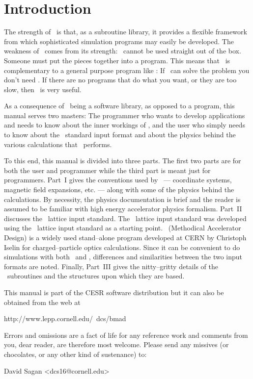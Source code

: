 \section*{Introduction}

The strength of \bmad\ is that, as a subroutine library, it provides a
flexible framework from which sophisticated simulation programs may
easily be developed.  The weakness of \bmad\ comes from its strength:
\bmad\ cannot be used straight out of the box. Someone must put the
pieces together into a program. This means that \bmad\ is complementary
to a general purpose program like \mad: If \mad\ can solve the problem
you don't need \bmad. If there are no programs that do what you want,
or they are too slow, then \bmad\ is very useful.

As a consequence of \bmad\ being a software library, as opposed to a
program, this manual serves two masters: The programmer who wants to
develop applications and needs to know about the inner workings of \bmad,
and the user who simply needs to know about the \bmad\ standard input
format and about the physics behind the various calculations that \bmad\
performs.

To this end, this manual is divided into three parts. The first two
parts are for both the user and programmer while the third part is
meant just for programmers. Part~I gives the conventions used by
\bmad\ --- coordinate systems, magnetic field expansions, etc. ---
along with some of the physics behind the calculations. By necessity,
the physics documentation is brief and the reader is assumed to be familiar
with high energy accelerator physics formalism. Part~II discusses the
\bmad\ lattice input standard.  The \bmad\ lattice input standard was
developed using the \mad\ lattice input standard as a starting
point. \mad\ (Methodical Accelerator Design) is a widely used
stand--alone program developed at CERN by Christoph Iselin for
charged--particle optics calculations. Since it can be convenient
to do simulations with both \mad\ and \bmad, differences and
similarities between the two input formats are noted. 
Finally, Part~III gives the nitty--gritty details of the \bmad\
subroutines and the structures upon which they are based.

This manual is part of the 
CESR software distribution but it can also be obtained from the web at
\begin{example}
  http://www.lepp.cornell.edu/~dcs/bmad
\end{example}

Errors and omissions are a fact of life for any reference work and
comments from you, dear reader, are therefore most welcome. Please
send any missives (or chocolates, or any other kind of sustenance) to:
\begin{example}
  David Sagan <dcs16@cornell.edu>
\end{example}
